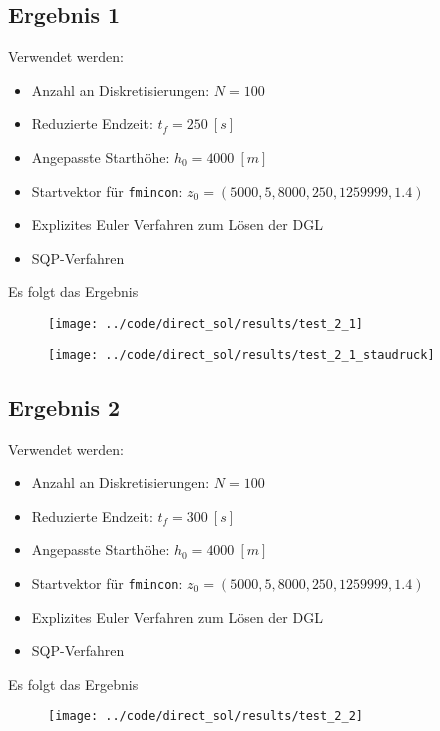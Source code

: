 \subsection{Ergebnis 1}\label{kap:Versuch21}
Verwendet werden:
\begin{itemize}
\item Anzahl an Diskretisierungen: $N = 100$ 
\item Reduzierte Endzeit: $t_f = 250 \ [s]$
\item Angepasste Starthöhe: $h_0 = 4000 \ [m]$
\item Startvektor für \texttt{fmincon}: $z_0 = (5000,5,8000,250,1259999,1.4)$
\item Explizites Euler Verfahren zum Lösen der DGL
%
\item SQP-Verfahren
\end{itemize}
Es folgt das Ergebnis
\begin{figure}[H]
\begin{center}
\texttt{[image: ../code/direct\_sol/results/test\_2\_1]}
 \label{img:test_2_1}
\end{center}
\end{figure}

\begin{figure}[H]
\begin{center}
\texttt{[image: ../code/direct\_sol/results/test\_2\_1\_staudruck]}
\label{img:test_2_1_staudruck}
\end{center}
\end{figure}




\subsection{Ergebnis 2}\label{kap:Versuch22}
Verwendet werden:
\begin{itemize}
\item Anzahl an Diskretisierungen: $N = 100$ 
\item Reduzierte Endzeit: $t_f = 300 \ [s]$
\item Angepasste Starthöhe: $h_0 = 4000 \ [m]$
\item Startvektor für \texttt{fmincon}: $z_0 = (5000,5,8000,250,1259999,1.4)$
\item Explizites Euler Verfahren zum Lösen der DGL
%
\item SQP-Verfahren
\end{itemize}
Es folgt das Ergebnis
\begin{figure}[H]
\begin{center}
\texttt{[image: ../code/direct\_sol/results/test\_2\_2]}
 \label{img:test_2_2}
\end{center}
\end{figure}

